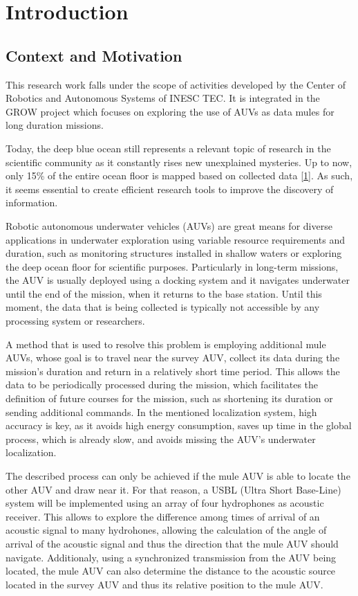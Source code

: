 \chapter{Introduction} \label{chap:intro}


\section{Context and Motivation} \label{sec:context}

This research work falls under the scope of activities developed by the Center of Robotics and Autonomous Systems of INESC TEC. It is integrated in the GROW project which focuses on exploring the use of AUVs as data mules for long duration missions.

Today, the deep blue ocean still represents a relevant topic of research in the scientific community as it constantly rises new unexplained mysteries. Up to now, only 15\% of the entire ocean floor is mapped based on collected data [\hyperref[eq:spd-sound]{1}]. As such, it seems essential to create efficient research tools to improve the discovery of information.


Robotic autonomous underwater vehicles (AUVs) are great means for diverse applications in underwater exploration using variable resource requirements and duration, such as monitoring structures installed in shallow waters or exploring the deep ocean floor for scientific purposes. Particularly in long-term missions, the AUV is usually deployed using a docking system and it navigates underwater until the end of the mission, when it returns to the base station. Until this moment, the data that is being collected is typically not accessible by any processing system or researchers. 

A method that is used to resolve this problem is employing additional mule AUVs, whose goal is to travel near the survey AUV, collect its data during the mission's duration and return in a relatively short time period. This allows the data to be periodically processed during the mission, which facilitates the definition of future courses for the mission, such as shortening its duration or sending additional commands. In the mentioned localization system, high accuracy is key, as it avoids high energy consumption, saves up time in the global process, which is already slow, and avoids missing the AUV's underwater localization.

The described process can only be achieved if the mule AUV is able to locate the other AUV and draw near it. For that reason, a USBL (Ultra Short Base-Line) system will be implemented using an array of four hydrophones as acoustic receiver. This allows to explore the difference among times of arrival of an acoustic signal to many hydrohones, allowing the calculation of the angle of arrival of the acoustic signal and thus the direction that the mule AUV should navigate. Additionaly, using a synchronized transmission from the AUV being located, the mule AUV can also determine the distance to the acoustic source located in the survey AUV and thus its relative position to the mule AUV.


